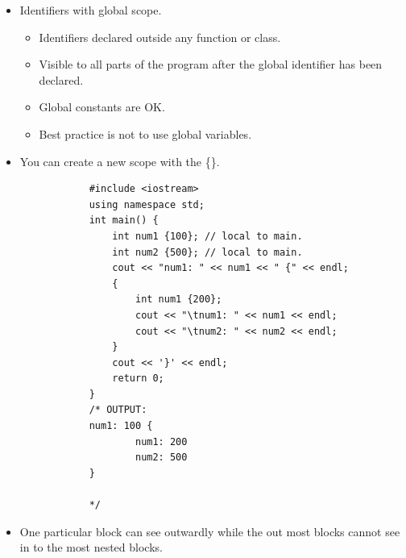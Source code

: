 \begin{itemize}
    \item Identifiers with global scope.
        \begin{itemize}
            \item Identifiers declared outside any function or class.
            \item Visible to all parts of the program after the  global identifier has been declared.
            \item Global constants are OK.
            \item Best practice is not to use global variables.
        \end{itemize}
    
    \item You can create a new scope with the \{\}.
        \begin{verbatim}
            #include <iostream>
            using namespace std;
            int main() {
                int num1 {100}; // local to main.
                int num2 {500}; // local to main.
                cout << "num1: " << num1 << " {" << endl;
                {
                    int num1 {200};
                    cout << "\tnum1: " << num1 << endl;
                    cout << "\tnum2: " << num2 << endl;
                }
                cout << '}' << endl;
                return 0;
            }
            /* OUTPUT:
            num1: 100 {
                    num1: 200
                    num2: 500
            }

            */
        \end{verbatim}
    
    \item One particular block can see outwardly while the out most blocks cannot see in to the most nested blocks.
\end{itemize}


